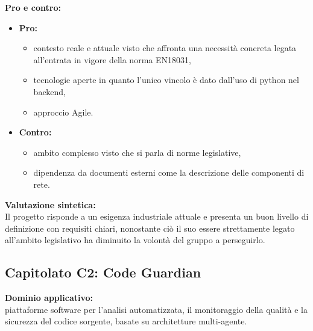 \vspace{0.3cm}
\textbf{Pro e contro:}
\begin{itemize}
	\item \textbf{Pro:}
        \begin{itemize}
            \item contesto reale e attuale visto che affronta una necessità concreta legata all'entrata in vigore della norma EN18031,
            \item tecnologie aperte in quanto l'unico vincolo è dato dall'uso di python nel backend,
            \item approccio Agile. 
        \end{itemize}
	\item \textbf{Contro:} 
        \begin{itemize}
            \item ambito complesso visto che si parla di norme legislative,
            \item dipendenza da documenti esterni come la descrizione delle componenti di rete.
        \end{itemize}
\end{itemize}

\vspace{0.3cm}
\textbf{Valutazione sintetica:} \\
Il progetto risponde a un esigenza industriale attuale e presenta un buon livello di definizione con requisiti chiari, nonostante ciò il suo
essere strettamente legato all'ambito legislativo ha diminuito la volontà del gruppo a perseguirlo.

\vspace{0.5cm}

\vspace{0.5cm}

\subsection{Capitolato C2: {Code Guardian} }

\textbf{Dominio applicativo:} \\
{piattaforme software per l’analisi automatizzata, il monitoraggio della qualità e la sicurezza del codice sorgente, basate su architetture multi-agente.}

